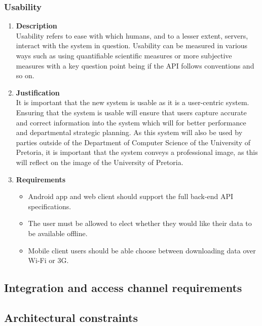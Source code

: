 \documentclass[a4paper,10pt]{article}
\begin{document}
	\subsubsection{Usability}
		\begin{enumerate}
			\item \textbf{Description} \\
				Usability refers to ease with which humans, and to a lesser extent, servers, interact with the system in question. Usability can be measured in various ways such as using quantifiable scientific measures or more subjective measures with a key question point being if the API follows conventions and so on.

			\item \textbf{Justification} \\
				It is important that the new system is usable as it is a user-centric system. Ensuring that the system is usable will ensure that users capture accurate and correct information into the system which will for better performance and departmental strategic planning. As this system will also be used by parties outside of the Department of Computer Science of the University of Pretoria, it is important that the system conveys a professional image, as this will reflect on the image of the University of Pretoria. 

			\item \textbf{Requirements}\\
				\begin{itemize}
					\item Android app and web client should support the full back-end API specifications.
					\item The user must be allowed to elect whether they would like their data to be available offline.
					\item Mobile client users should be able choose between downloading data over Wi-Fi or 3G.
				\end{itemize}
		\end{enumerate}

\subsection{Integration and access channel requirements}
\subsection{Architectural constraints}
\end{document}
